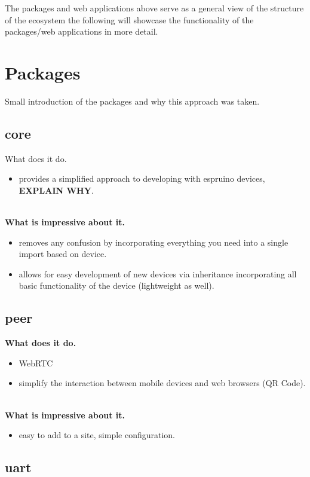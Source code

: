 \documentclass{l4proj}
\begin{document}
The packages and web applications above serve as a general view of the structure of the ecosystem the following will showcase the functionality of the packages/web applications in more detail.

\section{Packages}
Small introduction of the packages and why this approach was taken.
\subsection{core}

\text What does it do.
\begin{itemize}
    \item provides a simplified approach to developing with espruino devices, \textbf{EXPLAIN WHY}.
\end{itemize}
\\
\textbf{What is impressive about it.}
\begin{itemize}
    \item removes any confusion by incorporating everything you need into a single import based on device.
    \item allows for easy development of new devices via inheritance incorporating all basic functionality of the device (lightweight as well).
\end{itemize}
\subsection{peer}

\textbf{What does it do.}
\begin{itemize}
    \item WebRTC
    \item simplify the interaction between mobile devices and web browsers (QR Code).
\end{itemize}
\\
\textbf{What is impressive about it.}
\begin{itemize}
    \item easy to add to a site, simple configuration.
\end{itemize}
\subsection{uart}
\end{document}
